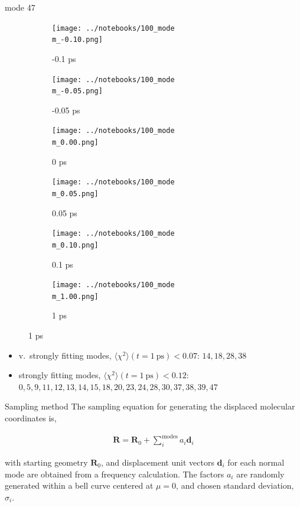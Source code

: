 \documentclass{beamer}
\begin{document}
\renewcommand\m{47}
\begin{frame}{mode \m}
	\begin{figure}
		\centering
		\begin{subfigure}[b]{\w\textwidth}
			\centering
			\texttt{[image: ../notebooks/100\_mode\\m\_-0.10.png]}
			\caption{-0.1 ps}
		\end{subfigure}
		\begin{subfigure}[b]{\w\textwidth}
			\centering
			\texttt{[image: ../notebooks/100\_mode\\m\_-0.05.png]}
			\caption{-0.05 ps}
		\end{subfigure}
		\begin{subfigure}[b]{\w\textwidth}
			\centering
			\texttt{[image: ../notebooks/100\_mode\\m\_0.00.png]}
			\caption{0 ps}
		\end{subfigure}
		\begin{subfigure}[b]{\w\textwidth}
			\centering
			\texttt{[image: ../notebooks/100\_mode\\m\_0.05.png]}
			\caption{0.05 ps}
		\end{subfigure}
		\begin{subfigure}[b]{\w\textwidth}
			\centering
			\texttt{[image: ../notebooks/100\_mode\\m\_0.10.png]}
			\caption{0.1 ps}
		\end{subfigure}
		\begin{subfigure}[b]{\w\textwidth}
			\centering
			\texttt{[image: ../notebooks/100\_mode\\m\_1.00.png]}
			\caption{1 ps}
		\end{subfigure}
	\end{figure}
\end{frame}

\fi %

\begin{frame}
	\begin{itemize}
		\item v.\ strongly fitting modes, $\langle\chi^2\rangle(t = 1\ \textrm{ps}) < 0.07$: $14,18,28,38$
		\item strongly fitting modes, $\langle\chi^2\rangle(t = 1\ \textrm{ps}) < 0.12$: $0,5,9,11,12,13,14,15,18,20,23,24,28,30,37,38,39,47$
	\end{itemize}
\end{frame}

\begin{frame}{Sampling method}
The sampling equation for generating the displaced molecular coordinates is,

\begin{eqnarray}
\textbf{R} = \textbf{R}_0 + \sum_i^{\textrm{modes}} a_i\textbf{d}_i
\end{eqnarray}

with starting geometry $\textbf{R}_0$, and displacement unit vectors $\textbf{d}_i$ for each normal mode are obtained from a frequency calculation.  The factors $a_i$ are randomly generated within a bell curve centered at $\mu=0$, and chosen standard deviation, $\sigma_i$. 
\end{frame}
\end{document}
